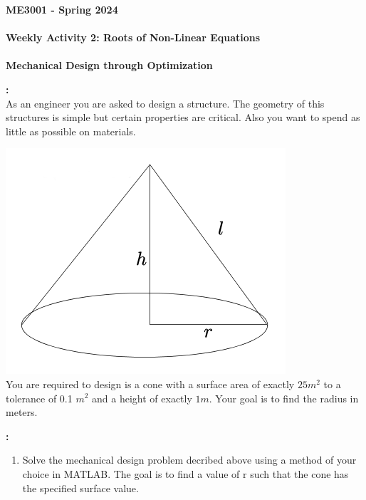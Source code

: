 \documentclass[11pt]{article}
\newcommand{\NUM}{2}
\begin{document}
	\textbf{\LARGE ME3001 - Spring 2024} \\\\
	\textbf{\LARGE Weekly Activity \NUM:  Roots of Non-Linear Equations}\\\\
	\textbf{\LARGE Mechanical Design through Optimization} \\
	
	\begin{description}
        \vspace{5mm}
    \item [\textbf{ \Large Overview}] \textbf{ \Large :}\\
	
				As an engineer you are asked to design a structure. The geometry of this structures is simple but certain properties are critical. Also you want to spend as little as possible on materials.
					
				\includegraphics[scale=.35]{lecture3_fig1.png}\\
					
				You are required to design is a cone with a surface area of exactly $25 m^2$ to a tolerance of 0.1 $m^2$ and a height of exactly $1 m$. Your goal is to find the radius in meters.\\
    \item [\textbf{ \large Assignment}] \textbf{ \Large :}\\

  \begin{enumerate}

    \item 

Solve the mechanical design problem decribed above using a method of your choice in MATLAB. The goal is to find a value of r such that the cone has the specified surface value.


\end{enumerate}
\end{description}
\end{document}
